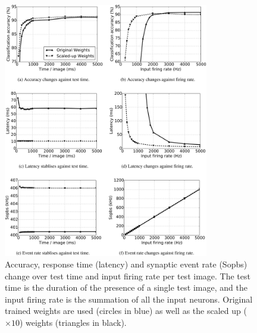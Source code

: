 \documentclass{frontiersENG} %
\begin{document}
\begin{figure}[htb!]
	\centering
	\includegraphics[width=0.8\textwidth]{fig7}
	\caption{Accuracy, response time (latency) and synaptic event rate (Sopbs) change over test time and input firing rate per test image.
	The test time is the duration of the presence of a single test image, and the input firing rate is the summation of all the input neurons.
	Original trained weights are used (circles in blue) as well as the scaled up ($\times10$) weights (triangles in black). }
	\label{fig:assess}
\end{figure}
\end{document}
